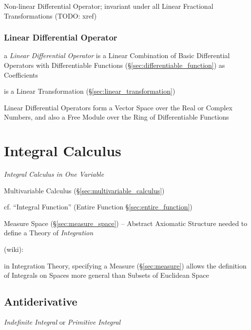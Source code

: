 Non-linear Differential Operator; invariant under all Linear Fractional
Transformations (TODO: xref)



\subsubsection{Linear Differential Operator}
\label{sec:linear_differential_operator}

a \emph{Linear Differential Operator} is a Linear Combination of Basic
Differential Operators with Differentiable Functions
(\S\ref{sec:differentiable_function}) as Coefficients

is a Linear Transformation (\S\ref{sec:linear_transformation})

Linear Differential Operators form a Vector Space over the Real or Complex
Numbers, and also a Free Module over the Ring of Differentiable Functions



\section{Integral Calculus}\label{sec:integral_calculus}

\emph{Integral Calculus in One Variable}

\fist Multivariable Calculus (\S\ref{sec:multivariable_calculus})

cf. ``Integral Function'' (Entire Function \S\ref{sec:entire_function})

\fist Measure Space (\S\ref{sec:measure_space}) -- Abstract Axiomatic Structure
needed to define a Theory of \emph{Integration}

(wiki):

in Integration Theory, specifying a Measure (\S\ref{sec:measure}) allows the
definition of Integrals on Spaces more general than Subsets of Euclidean Space



\subsection{Antiderivative}\label{sec:antiderivative}

\emph{Indefinite Integral} or \emph{Primitive Integral}

